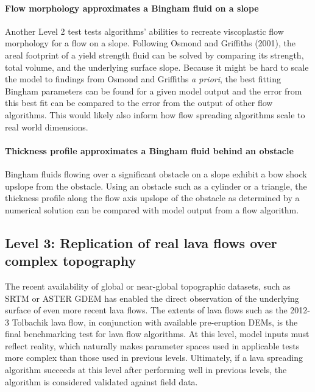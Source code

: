 \documentclass[12pt,letter]{article}
\begin{document}
			\paragraph{Flow morphology approximates a Bingham fluid on a slope}
				Another Level 2 test tests algorithms' abilities to recreate viscoplastic flow morphology for a flow on a slope. Following Osmond and Griffiths (2001), the areal footprint of a yield strength fluid can be solved by comparing its strength, total volume, and the underlying surface slope. Because it might be hard to scale the model to findings from Osmond and Griffiths \textit{a priori}, the best fitting Bingham parameters can be found for a given model output and the error from this best fit can be compared to the error from the output of other flow algorithms. This would likely also inform how flow spreading algorithms scale to real world dimensions.

			\paragraph{Thickness profile approximates a Bingham fluid behind an obstacle}
				Bingham fluids flowing over a significant obstacle on a slope exhibit a bow shock upslope from the obstacle. Using an obstacle such as a cylinder or a triangle, the thickness profile along the flow axis upslope of the obstacle as determined by a numerical solution can be compared with model output from a flow algorithm.



	\subsection{Level 3: Replication of real lava flows over complex topography}
		The recent availability of global or near-global topographic datasets, such as SRTM or ASTER GDEM has enabled the direct observation of the underlying surface of even more recent lava flows. The extents of lava flows such as the 2012-3 Tolbachik lava flow, in conjunction with available pre-eruption DEMs, is the final benchmarking test for lava flow algorithms. At this level, model inputs must reflect reality, which naturally makes parameter spaces used in applicable tests more complex than those used in previous levels. Ultimately, if a lava spreading algorithm succeeds at this level after performing well in previous levels, the algorithm is considered validated against field data.
\end{document}
